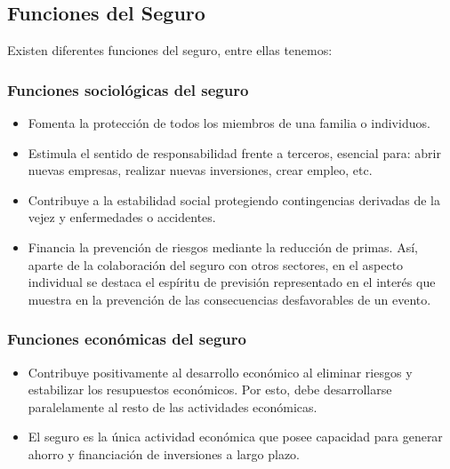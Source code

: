 



\subsection{Funciones del Seguro}
\setlength{\parskip}{5mm}

Existen diferentes funciones del seguro, entre ellas tenemos: 

\setlength{\parskip}{0mm}

\subsubsection{Funciones sociológicas del seguro}

\begin{itemize}
	\item Fomenta la  protección de todos los miembros de una familia o individuos.

	\item Estimula el sentido de responsabilidad frente a terceros, esencial para: abrir nuevas empresas, realizar nuevas inversiones, crear empleo, etc.

	\item Contribuye a la estabilidad social protegiendo contingencias derivadas de la vejez y enfermedades o 
	accidentes.

	\item Financia la prevención de riesgos mediante la reducción de primas. Así, aparte de la colaboración del seguro con otros sectores, en el aspecto individual se destaca el espíritu de previsión representado en el interés que muestra en la prevención de las consecuencias desfavorables de un evento.

\end{itemize}

\subsubsection{Funciones económicas del seguro}

\begin{itemize}
	\item Contribuye positivamente al desarrollo económico al eliminar riesgos y estabilizar los resupuestos económicos. Por esto, debe desarrollarse paralelamente al resto de las actividades económicas.

	\item El seguro es la única actividad económica que posee capacidad para generar ahorro y financiación de inversiones a largo plazo.%

\end{itemize}

